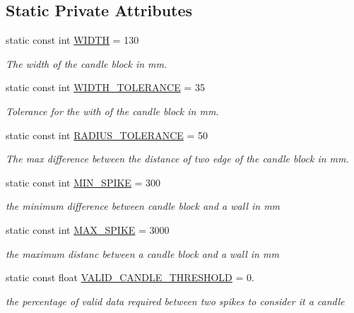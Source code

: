 \subsection*{Static Private Attributes}
\begin{DoxyCompactItemize}
\item 
static const int \hyperlink{classCandleDetector_af4c5d2170cea56fa4263639f20ed13ed}{W\-I\-D\-T\-H} = 130
\begin{DoxyCompactList}\small\item\em The width of the candle block in mm. \end{DoxyCompactList}\item 
static const int \hyperlink{classCandleDetector_a1c8f0232491ba37dd10032c1da376145}{W\-I\-D\-T\-H\-\_\-\-T\-O\-L\-E\-R\-A\-N\-C\-E} = 35
\begin{DoxyCompactList}\small\item\em Tolerance for the with of the candle block in mm. \end{DoxyCompactList}\item 
static const int \hyperlink{classCandleDetector_ab3c96353ba6d64163cf5e44b1ce2aa9e}{R\-A\-D\-I\-U\-S\-\_\-\-T\-O\-L\-E\-R\-A\-N\-C\-E} = 50
\begin{DoxyCompactList}\small\item\em The max difference between the distance of two edge of the candle block in mm. \end{DoxyCompactList}\item 
static const int \hyperlink{classCandleDetector_a9062a3c45b98c5d051082dbf4a285fd5}{M\-I\-N\-\_\-\-S\-P\-I\-K\-E} = 300
\begin{DoxyCompactList}\small\item\em the minimum difference between candle block and a wall in mm \end{DoxyCompactList}\item 
static const int \hyperlink{classCandleDetector_a3903cd4085162f1fc38ca74cac3b954e}{M\-A\-X\-\_\-\-S\-P\-I\-K\-E} = 3000
\begin{DoxyCompactList}\small\item\em the maximum distanc between a candle block and a wall in mm \end{DoxyCompactList}\item 
static const float \hyperlink{classCandleDetector_ac8aa00d0477ff096c344ec71d8ccdf82}{V\-A\-L\-I\-D\-\_\-\-C\-A\-N\-D\-L\-E\-\_\-\-T\-H\-R\-E\-S\-H\-O\-L\-D} = 0.
\begin{DoxyCompactList}\small\item\em the percentage of valid data required between two spikes to consider it a candle \end{DoxyCompactList}\end{DoxyCompactItemize}


